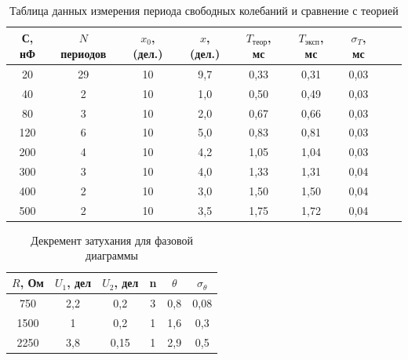 \documentclass[a4paper, 12pt]{article}%
\begin{document}
\begin{table}[h!]
\begin{center}
\begin{tabular}{|c|c|c|c|c|c|c|c|c|}
\hline
С, нФ & $N$ периодов & $x_0$, (дел.) & $x$, (дел.) & $T_{\text{теор}}$, мс & $T_{\text{эксп}}$, мс & $\sigma_T$, мс \\ \hline
20               & 29  & 10  &  9,7    & 0,33           & 0,31            & 0,03           \\ \hline
40               & 2   & 10  &  1,0    & 0,50           & 0,49            & 0,03           \\ \hline
80               & 3   & 10  &  2,0    & 0,67           & 0,66            & 0,03           \\ \hline
120              & 6   & 10  &  5,0    & 0,83           & 0,81            & 0,03           \\ \hline
200              & 4   & 10  &  4,2    & 1,05           & 1,04            & 0,03           \\ \hline
300              & 3   & 10  &  4,0    & 1,33           & 1,31            & 0,04           \\ \hline
400              & 2   & 10  &  3,0    & 1,50           & 1,50            & 0,04           \\ \hline
500              & 2   & 10  &  3,5    & 1,75           & 1,72            & 0,04           \\ \hline
\end{tabular}
\caption{Таблица данных измерения периода свободных колебаний и сравнение с теорией}
\end{center}
\end{table}



\begin{table}[h!]
\begin{center}
\begin{tabular}{|c|c|c|c|c|c|}
\hline
$R$, Ом & $U_1$, дел & $U_2$, дел & n & $\theta$ & $\sigma_{\theta}$ \\ \hline
750  & 2,2  & 0,2        & 3 & 0,8    & 0,08              \\ \hline
1500 & 1    & 0,2        & 1 & 1,6    & 0,3              \\ \hline
2250 & 3,8    & 0,15     & 1 & 2,9    & 0,5              \\ \hline
\end{tabular}
\caption{Декремент затухания для фазовой диаграммы}
\end{center}
\end{table}
\end{document}
